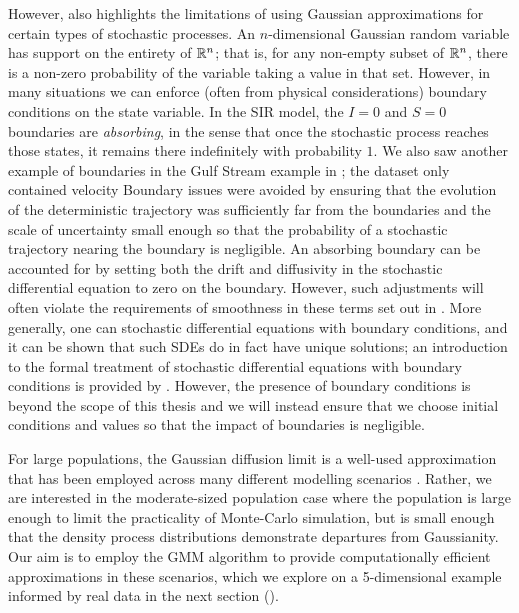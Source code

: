However,  also highlights the limitations of using Gaussian approximations for certain types of stochastic processes.
An \(n\)-dimensional Gaussian random variable has support on the entirety of \(\mathbb{R}^n\); that is, for any non-empty subset of \(\mathbb{R}^n\), there is a non-zero probability of the variable taking a value in that set.
However, in many situations we can enforce (often from physical considerations) boundary conditions on the state variable.
In the SIR model, the \(I = 0\) and \(S = 0\) boundaries are \emph{absorbing}, in the sense that once the stochastic process reaches those states, it remains there indefinitely with probability \(1\).
We also saw another example of boundaries in the Gulf Stream example in ; the dataset only contained velocity
Boundary issues were avoided by ensuring that the evolution of the deterministic trajectory was sufficiently far from the boundaries and the scale of uncertainty small enough so that the probability of a stochastic trajectory nearing the boundary is negligible.
An absorbing boundary can be accounted for by setting both the drift and diffusivity in the stochastic differential equation to zero on the boundary.
However, such adjustments will often violate the requirements of smoothness in these terms set out in .
More generally, one can stochastic differential equations with boundary conditions, and it can be shown that such SDEs do in fact have unique solutions; an introduction to the formal treatment of stochastic differential equations with boundary conditions is provided by \citet{Pilipenko_2014_IntroductionStochasticDifferential}.
However, the presence of boundary conditions is beyond the scope of this thesis and we will instead ensure that we choose initial conditions and values so that the impact of boundaries is negligible.


For large populations, the Gaussian diffusion limit is a well-used approximation that has been employed across many different modelling scenarios \citep[e.g.]{PollettEtAl_2010_ModellingPopulationProcesses}.
Rather, we are interested in the moderate-sized population case where the population is large enough to limit the practicality of Monte-Carlo simulation, but is small enough that the density process distributions demonstrate departures from Gaussianity.
Our aim is to employ the GMM algorithm to provide computationally efficient approximations in these scenarios, which we explore on a 5-dimensional example informed by real data in the next section ().

